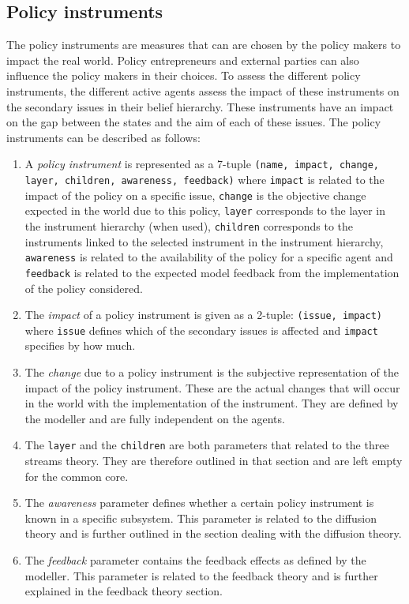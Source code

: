 \subsection{Policy instruments}

The policy instruments are measures that can are chosen by the policy makers to impact the real world. Policy entrepreneurs and external parties can also influence the policy makers in their choices. To assess the different policy instruments, the different active agents assess the impact of these instruments on the secondary issues in their belief hierarchy. These instruments have an impact on the gap between the states and the aim of each of these issues. The policy instruments can be described as follows:

\begin{enumerate}
\item A \emph{policy instrument} is represented as a 7-tuple \texttt{(name, impact, change, layer, children, awareness, feedback)} where \texttt{impact} is related to the impact of the policy on a specific issue, \texttt{change} is the objective change expected in the world due to this policy, \texttt{layer} corresponds to the layer in the instrument hierarchy (when used), \texttt{children} corresponds to the instruments linked to the selected instrument in the instrument hierarchy, \texttt{awareness} is related to the availability of the policy for a specific agent and \texttt{feedback} is related to the expected model feedback from the implementation of the policy considered.

\item The \emph{impact} of a policy instrument is given as a 2-tuple: \texttt{(issue, impact)} where \texttt{issue} defines which of the secondary issues is affected and \texttt{impact} specifies by how much.

\item The \emph{change} due to a policy instrument is the subjective representation of the impact of the policy instrument. These are the actual changes that will occur in the world with the implementation of the instrument. They are defined by the modeller and are fully independent on the agents.

\item The \texttt{layer} and the \texttt{children} are both parameters that related to the three streams theory. They are therefore outlined in that section and are left empty for the common core.

\item The \emph{awareness} parameter defines whether a certain policy instrument is known in a specific subsystem. This parameter is related to the diffusion theory and is further outlined in the section dealing with the diffusion theory.

\item The \emph{feedback} parameter contains the feedback effects as defined by the modeller. This parameter is related to the feedback theory and is further explained in the feedback theory section.
\end{enumerate}

